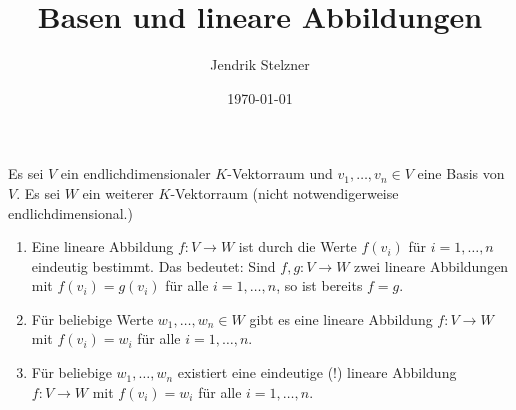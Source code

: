 \documentclass[a4paper,10pt]{article}
\title{Basen und lineare Abbildungen}
\author{Jendrik Stelzner}
\date{\today}
\begin{document}
\maketitle

\begin{thrm}
 Es sei $V$ ein endlichdimensionaler $K$-Vektorraum und $v_1, \dotsc, v_n \in V$ eine Basis von $V$. Es sei $W$ ein weiterer $K$-Vektorraum (nicht notwendigerweise endlichdimensional.)
 \begin{enumerate}[label=\roman*)]
  \item
   Eine lineare Abbildung $f \colon V \to W$ ist durch die Werte $f(v_i)$ für $i = 1, \dotsc, n$ eindeutig bestimmt. Das bedeutet: Sind $f, g \colon V \to W$ zwei lineare Abbildungen mit $f(v_i) = g(v_i)$ für alle $i = 1, \dotsc, n$, so ist bereits $f = g$.
  \item
   Für beliebige Werte $w_1, \dotsc, w_n \in W$ gibt es eine lineare Abbildung $f \colon V \to W$ mit $f(v_i) = w_i$ für alle $i = 1, \dotsc, n$.
  \item
   Für beliebige $w_1, \dotsc, w_n$ existiert eine eindeutige (!) lineare Abbildung $f \colon V \to W$ mit $f(v_i) = w_i$ für alle $i = 1, \dotsc, n$.
 \end{enumerate}
\end{thrm}
\end{document}
